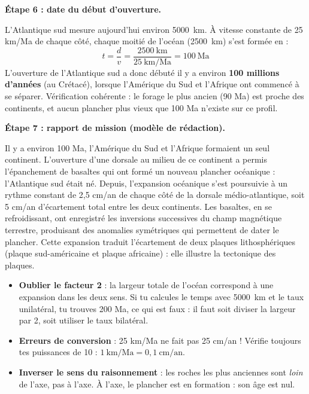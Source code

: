 \documentclass[11pt]{article}
\begin{document}
\begin{exoresolu}
\textbf{Étape 6 : date du début d'ouverture.}

L'Atlantique sud mesure aujourd'hui environ \SI{5000}{km}. À vitesse constante de 25 km/Ma de chaque côté, chaque moitié de l'océan (\SI{2500}{km}) s'est formée en :
\[ t = \dfrac{d}{v} = \dfrac{2500~\text{km}}{25~\text{km/Ma}} = 100~\text{Ma} \]
L'ouverture de l'Atlantique sud a donc débuté il y a environ \textbf{100 millions d'années} (au Crétacé), lorsque l'Amérique du Sud et l'Afrique ont commencé à se séparer. Vérification cohérente : le forage le plus ancien (90 Ma) est proche des continents, et aucun plancher plus vieux que 100 Ma n'existe sur ce profil.

\textbf{Étape 7 : rapport de mission (modèle de rédaction).}

\og Il y a environ 100 Ma, l'Amérique du Sud et l'Afrique formaient un seul continent. L'ouverture d'une dorsale au milieu de ce continent a permis l'épanchement de basaltes qui ont formé un nouveau plancher océanique : l'Atlantique sud était né. Depuis, l'expansion océanique s'est poursuivie à un rythme constant de 2,5 cm/an de chaque côté de la dorsale médio-atlantique, soit 5 cm/an d'écartement total entre les deux continents. Les basaltes, en se refroidissant, ont enregistré les inversions successives du champ magnétique terrestre, produisant des anomalies symétriques qui permettent de dater le plancher. Cette expansion traduit l'écartement de deux plaques lithosphériques (plaque sud-américaine et plaque africaine) : elle illustre la tectonique des plaques. \fg
\end{exoresolu}

\begin{attention}
\begin{itemize}
\item \textbf{Oublier le facteur 2} : la largeur totale de l'océan correspond à une expansion dans les deux sens. Si tu calcules le temps avec \SI{5000}{km} et le taux unilatéral, tu trouves 200 Ma, ce qui est faux : il faut soit diviser la largeur par 2, soit utiliser le taux bilatéral.
\item \textbf{Erreurs de conversion} : 25 km/Ma ne fait pas 25 cm/an ! Vérifie toujours tes puissances de 10 : $1~\text{km/Ma} = 0{,}1~\text{cm/an}$.
\item \textbf{Inverser le sens du raisonnement} : les roches les plus anciennes sont \emph{loin} de l'axe, pas à l'axe. À l'axe, le plancher est en formation : son âge est nul.
\end{itemize}
\end{attention}
\end{document}
